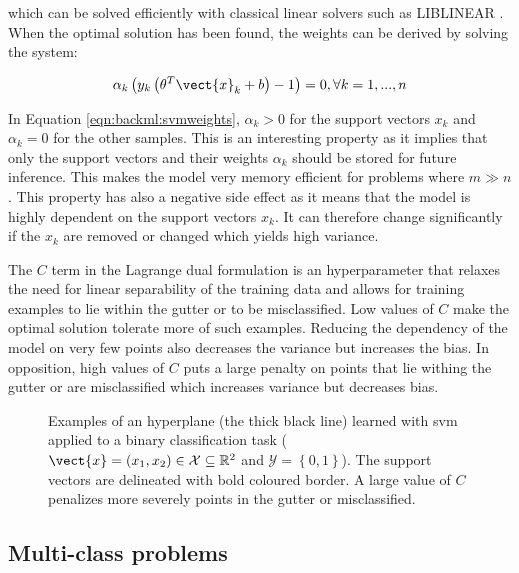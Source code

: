which can be solved efficiently with classical linear solvers such as LIBLINEAR
\parencite{fan2008liblinear}. When the optimal solution has been found, the weights
can be derived by solving the system:

\begin{equation}
\label{eqn:backml:svmweights}
\alpha_k\left(y_k \left(\theta^T \vect{x}_k + b\right) - 1\right) = 0, \forall k = 1, ..., n
\end{equation}

In Equation \ref{eqn:backml:svmweights}, $\alpha_k > 0$ for the support vectors
$x_k$ and $\alpha_k = 0$ for the other samples. This is an interesting property
as it implies that only the support vectors and their weights $\alpha_k$ should
be stored for future inference. This makes the model very memory efficient for
problems where $m \gg n$. This property has also a negative side effect as it
means that the model is highly dependent on the support vectors $x_k$. It can
therefore change significantly if the $x_k$ are removed or changed which yields
high variance.

The $C$ term in the Lagrange dual formulation is an hyperparameter that relaxes
the need for linear separability of the training data and allows for training
examples to lie within the gutter or to be misclassified. Low values of $C$ make
the optimal solution tolerate more of such examples. Reducing the dependency of
the model on very few points also decreases the variance but increases the bias.
In opposition, high values of $C$ puts a large penalty on points that lie withing
the gutter or are misclassified which increases variance but decreases bias.

\begin{figure}
  \centering
  \caption{Examples of an hyperplane (the thick black line) learned with \acrshort{svm} applied to a binary classification task ($\vect{x} = (x_1, x_2) \in \mathcal{X} \subseteq \mathbb{R}^2$ and $\mathcal{Y} = \left\{0, 1\right\}$). The support vectors are delineated with bold coloured border. A large value of $C$ penalizes more severely points in the gutter or misclassified.}
  \label{fig:backml:svm}
\end{figure}


\subsection{Multi-class problems}


